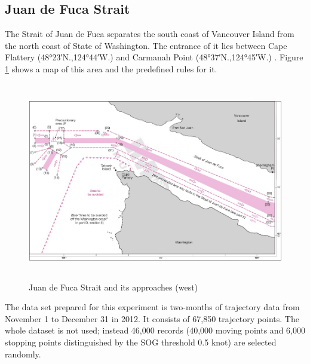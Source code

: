 \documentclass[12pt,glossary]{dalcsthesis}
\begin{document}
 
\subsection{Juan de Fuca Strait}
\label{sec:exp_1.1}
The Strait of Juan de Fuca separates the south coast of Vancouver Island from the north coast of State of Washington. The entrance of it lies between Cape Flattery (\ang{48;23;}N.,\ang{124;44;}W.) and Carmanah Point (\ang{48;37;}N.,\ang{124;45;}W.) \cite{juandefuca}. Figure \ref{fig:jdfk_pic} shows a map of this area and the predefined rules for it.

\begin{figure}[!htb]
\centering
\includegraphics[width=4.9in,height=3.4in]{jdfk_pic.png}
\caption{Juan de Fuca Strait and its approaches (west) \cite{anabook} }
\label{fig:jdfk_pic}
\end{figure}

The data set prepared for this experiment is two-months of trajectory data from November 1 to December 31 in 2012. It consists of 67,850 trajectory points. The whole dataset is not used; instead 46,000 records (40,000 moving points and 6,000 stopping points distinguished by the SOG threshold 0.5 knot) are selected randomly.

\end{document}

